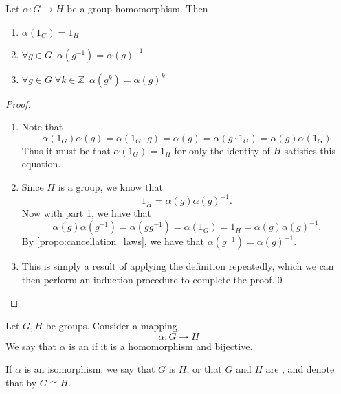 \begin{propo}
\label{propo:properties_of_homomorphism}
  Let $\alpha: G \to H$ be a group homomorphism. Then
  \begin{enumerate}
    \item $\alpha(1_G) = 1_H$
    \item $\forall g \in G \enspace \alpha(g^{-1}) = \alpha(g)^{-1}$
    \item $\forall g \in G \; \forall k \in \mathbb{Z} \enspace \alpha(g^k) = \alpha(g)^k$
  \end{enumerate}
\end{propo}

\begin{proof}
  \begin{enumerate}
    \item Note that
      \begin{equation*}
        \alpha(1_G) \alpha(g) = \alpha(1_G \cdot g) = \alpha(g) = \alpha(g \cdot 1_G) = \alpha(g) \alpha(1_G)
      \end{equation*}
      Thus it must be that $\alpha(1_G) = 1_H$ for only the identity of $H$ satisfies this equation.

    \item Since $H$ is a group, we know that
      \begin{equation*}
        1_H = \alpha(g)\alpha(g)^{-1}.
      \end{equation*}
      Now with part 1, we have that
      \begin{equation*}
        \alpha(g)\alpha(g^{-1}) = \alpha(gg^{-1}) = \alpha(1_G) = 1_H = \alpha(g)\alpha(g)^{-1}.
      \end{equation*}
      By \cref{propo:cancellation_laws}, we have that $\alpha(g^{-1}) = \alpha(g)^{-1}$.

    \item This is simply a result of applying the definition repeatedly, which we can then perform an induction procedure to complete the proof.\qed
  \end{enumerate}
\end{proof}

\begin{defn}[Isomorphism]
\label{defn:isomorphism}
  Let $G, H$ be groups. Consider a mapping
  \begin{equation*}
    \alpha: G \to H
  \end{equation*}
  We say that $\alpha$ is an  if it is a homomorphism and bijective.

  If $\alpha$ is an isomorphism, we say that $G$ is  $H$, or that $G$ and $H$ are , and denote that by $G \cong H$.
\end{defn}

